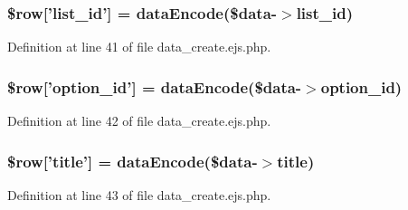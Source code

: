 \hypertarget{administration_2lists_2data__create_8ejs_8php_a76772cd03c99434f33a506cf72f49b4f}{
\subsubsection[{\$row}]{\setlength{\rightskip}{0pt plus 5cm}\$row\mbox{[}'list\-\_\-id'\mbox{]} = {\bf data\-Encode}(\$data-\/$>$list\-\_\-id)}}\label{administration_2lists_2data__create_8ejs_8php_a76772cd03c99434f33a506cf72f49b4f}


\-Definition at line 41 of file data\-\_\-create.\-ejs.\-php.

\hypertarget{administration_2lists_2data__create_8ejs_8php_ab8498685515a366e1b6d5caad5eb57ee}{
\subsubsection[{\$row}]{\setlength{\rightskip}{0pt plus 5cm}\$row\mbox{[}'option\-\_\-id'\mbox{]} = {\bf data\-Encode}(\$data-\/$>$option\-\_\-id)}}\label{administration_2lists_2data__create_8ejs_8php_ab8498685515a366e1b6d5caad5eb57ee}


\-Definition at line 42 of file data\-\_\-create.\-ejs.\-php.

\hypertarget{administration_2lists_2data__create_8ejs_8php_a70d36cba6a35524466f2a4c8112c8e4e}{
\subsubsection[{\$row}]{\setlength{\rightskip}{0pt plus 5cm}\$row\mbox{[}'title'\mbox{]} = {\bf data\-Encode}(\$data-\/$>$title)}}\label{administration_2lists_2data__create_8ejs_8php_a70d36cba6a35524466f2a4c8112c8e4e}


\-Definition at line 43 of file data\-\_\-create.\-ejs.\-php.

